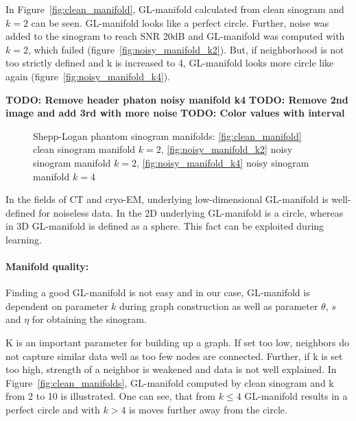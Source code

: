 In Figure~\ref{fig:clean_manifold}, GL-manifold calculated from clean sinogram and $k=2$ can be seen.
GL-manifold looks like a perfect circle. Further, noise was added to the sinogram 
to reach SNR 20dB and GL-manifold was computed with $k=2$, which failed (figure~\ref{fig:noisy_manifold_k2}).
But, if neighborhood is not too strictly defined and k is increased to 4, GL-manifold looks more circle like again
(figure~\ref{fig:noisy_manifold_k4}).

\textbf{TODO: Remove header phaton noisy manifold k4}
\textbf{TODO: Remove 2nd image and add 3rd with more noise}
\textbf{TODO: Color values with interval }

\begin{figure}[H]
    \centering
    \hfill
        \hfill
    \hfill
    \hfill
    \caption{Shepp-Logan phantom sinogram manifolds:
    \ref{fig:clean_manifold} clean sinogram manifold $k=2$,
    \ref{fig:noisy_manifold_k2} noisy sinogram manifold $k=2$,
    \ref{fig:noisy_manifold_k4} noisy sinogram manifold $k=4$
    }
\end{figure}

\begin{tcolorbox}[colback=red!5!white,colframe=red!75!black]
    In the fields of CT and cryo-EM, underlying low-dimensional GL-manifold is well-defined for noiseless data.
    In the 2D underlying GL-manifold is a circle, whereas in 3D  GL-manifold is defined as a sphere.
    This fact can be exploited during learning.
\end{tcolorbox}

\paragraph{Manifold quality:}

Finding a good GL-manifold is not easy and in our case, GL-manifold is dependent on parameter $k$ during graph construction
as well as parameter $\theta$, $s$ and $\eta$ for obtaining the sinogram.

K is an important parameter for building up a graph. If set too low, neighbors
do not capture similar data well as too few nodes are connected. 
Further, if k is set too high, strength of a neighbor 
is weakened and data is not well explained.
In Figure~\ref{fig:clean_manifolds}, GL-manifold computed by clean sinogram and k from 2 to 10 is illustrated.
One can see, that from $k \leq 4$ GL-manifold results in a perfect circle and with $k >  4$ is moves 
further away from the circle. 


